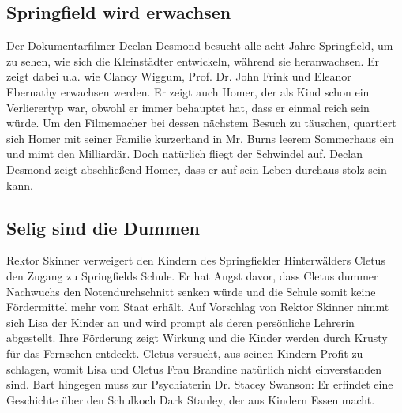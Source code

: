 \subsection{Springfield wird erwachsen}\label{JABF07}
Der Dokumentarfilmer Declan Desmond besucht alle acht Jahre Springfield, um zu sehen, wie sich die Kleinstädter entwickeln, während sie heranwachsen. Er zeigt dabei u.a. wie Clancy Wiggum, Prof. Dr. John Frink und Eleanor Ebernathy erwachsen werden. Er zeigt auch Homer, der als Kind schon ein Verlierertyp war, obwohl er immer behauptet hat, dass er einmal reich sein würde. Um den Filmemacher bei dessen nächstem Besuch zu täuschen, quartiert sich Homer mit seiner Familie kurzerhand in Mr. Burns leerem Sommerhaus ein und mimt den Milliardär. Doch natürlich fliegt der Schwindel auf. Declan Desmond zeigt abschließend Homer, dass er auf sein Leben durchaus stolz sein kann.


\subsection{Selig sind die Dummen}
Rektor Skinner verweigert den Kindern des Springfielder Hinterwälders Cletus den Zugang zu Springfields Schule. Er hat Angst davor, dass Cletus dummer Nachwuchs den Notendurchschnitt senken würde und die Schule somit keine Fördermittel mehr vom Staat erhält. Auf Vorschlag von Rektor Skinner nimmt sich Lisa der Kinder an und wird prompt als deren persönliche Lehrerin abgestellt. Ihre Förderung zeigt Wirkung und die Kinder werden durch Krusty für das Fernsehen entdeckt. Cletus versucht, aus seinen Kindern Profit zu schlagen, womit Lisa und Cletus Frau Brandine natürlich nicht einverstanden sind. Bart hingegen muss zur Psychiaterin Dr. Stacey Swanson: Er erfindet eine Geschichte über den Schulkoch Dark Stanley, der aus Kindern Essen macht.

